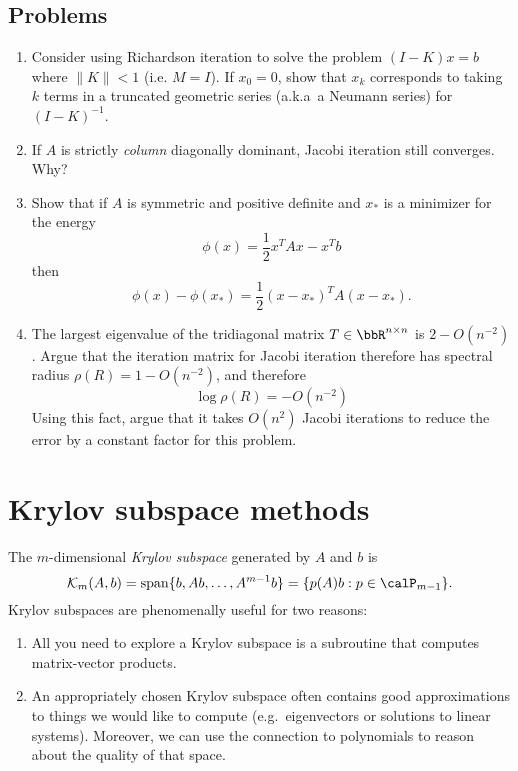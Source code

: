 \documentclass[12pt, leqno]{article}
\newcommand{\calK}{\mathcal{K}}
\begin{document}
\subsection{Problems}

\begin{enumerate}
\item
  Consider using Richardson iteration to solve the problem
  $(I-K) x = b$ where $\|K\| < 1$ (i.e. $M = I$).  If $x_0 = 0$,
  show that $x_k$ corresponds to taking $k$ terms in a truncated
  geometric series (a.k.a~a Neumann series) for $(I-K)^{-1}$.
\item
  If $A$ is strictly {\em column} diagonally dominant, Jacobi
  iteration still converges.  Why?
\item
  Show that if $A$ is symmetric and positive definite and
  $x_*$ is a minimizer for the energy
  \[
    \phi(x) = \frac{1}{2} x^T A x - x^T b
  \]
  then
  \[
    \phi(x)-\phi(x_*) = \frac{1}{2} (x-x_*)^T A (x-x_*).
  \]
\item
  The largest eigenvalue of the tridiagonal matrix
  $T \in \bbR^{n \times n}$ is $2 - O(n^{-2})$.
  Argue that the iteration matrix for Jacobi iteration therefore
  has spectral radius $\rho(R) = 1-O(n^{-2})$, and therefore
  \[
    \log \rho(R) = -O(n^{-2})
  \]
  Using this fact, argue that it takes $O(n^2)$ Jacobi iterations
  to reduce the error by a constant factor for this problem.
\end{enumerate}

\newpage
\section{Krylov subspace methods}

The $m$-dimensional {\em Krylov subspace} generated by $A$ and $b$ is
\[
  \calK_m(A,b)
    = \operatorname{span}\{ b, Ab, \ldots, A^{m-1} b \}
    = \{ p(A) b : p \in \calP_{m-1} \}.
\]
Krylov subspaces are phenomenally useful for two reasons:
\begin{enumerate}
\item
  All you need to explore a Krylov subspace is a subroutine
  that computes matrix-vector products.
\item
  An appropriately chosen Krylov subspace often contains good
  approximations to things we would like to compute (e.g.~eigenvectors
  or solutions to linear systems).  Moreover, we can use the
  connection to polynomials to reason about the quality of that space.
\end{enumerate}
\end{document}

